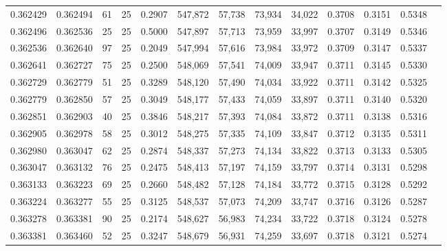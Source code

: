 \begin{tabular}{rrrrrrrrrrrrr}
0.362429 & 0.362494 &    61 &  25 &                                     0.2907 & 547,872 &  57,738 &  73,934 &  34,022 & 0.3708 & 0.3151 & 0.5348 \\
0.362496 & 0.362536 &    25 &  25 &                                     0.5000 & 547,897 &  57,713 &  73,959 &  33,997 & 0.3707 & 0.3149 & 0.5346 \\
0.362536 & 0.362640 &    97 &  25 &                                     0.2049 & 547,994 &  57,616 &  73,984 &  33,972 & 0.3709 & 0.3147 & 0.5337 \\
0.362641 & 0.362727 &    75 &  25 &                                     0.2500 & 548,069 &  57,541 &  74,009 &  33,947 & 0.3711 & 0.3145 & 0.5330 \\
0.362729 & 0.362779 &    51 &  25 &                                     0.3289 & 548,120 &  57,490 &  74,034 &  33,922 & 0.3711 & 0.3142 & 0.5325 \\
0.362779 & 0.362850 &    57 &  25 &                                     0.3049 & 548,177 &  57,433 &  74,059 &  33,897 & 0.3711 & 0.3140 & 0.5320 \\
0.362851 & 0.362903 &    40 &  25 &                                     0.3846 & 548,217 &  57,393 &  74,084 &  33,872 & 0.3711 & 0.3138 & 0.5316 \\
0.362905 & 0.362978 &    58 &  25 &                                     0.3012 & 548,275 &  57,335 &  74,109 &  33,847 & 0.3712 & 0.3135 & 0.5311 \\
0.362980 & 0.363047 &    62 &  25 &                                     0.2874 & 548,337 &  57,273 &  74,134 &  33,822 & 0.3713 & 0.3133 & 0.5305 \\
0.363047 & 0.363132 &    76 &  25 &                                     0.2475 & 548,413 &  57,197 &  74,159 &  33,797 & 0.3714 & 0.3131 & 0.5298 \\
0.363133 & 0.363223 &    69 &  25 &                                     0.2660 & 548,482 &  57,128 &  74,184 &  33,772 & 0.3715 & 0.3128 & 0.5292 \\
0.363224 & 0.363277 &    55 &  25 &                                     0.3125 & 548,537 &  57,073 &  74,209 &  33,747 & 0.3716 & 0.3126 & 0.5287 \\
0.363278 & 0.363381 &    90 &  25 &                                     0.2174 & 548,627 &  56,983 &  74,234 &  33,722 & 0.3718 & 0.3124 & 0.5278 \\
0.363381 & 0.363460 &    52 &  25 &                                     0.3247 & 548,679 &  56,931 &  74,259 &  33,697 & 0.3718 & 0.3121 & 0.5274 \\

\end{tabular}
